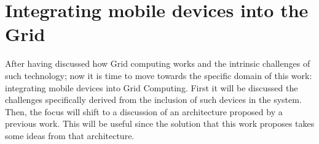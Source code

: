 \chapter{Integrating mobile devices into the Grid}
After having discussed how Grid computing works and the intrinsic challenges of such technology; now it is time to move towards the specific domain of this work: integrating mobile devices into Grid Computing. First it will be discussed the challenges specifically derived from the inclusion of such devices in the system. Then, the focus will shift to a discussion of an architecture proposed by a previous work. This will be useful since the solution that this work proposes takes some ideas from that architecture.


